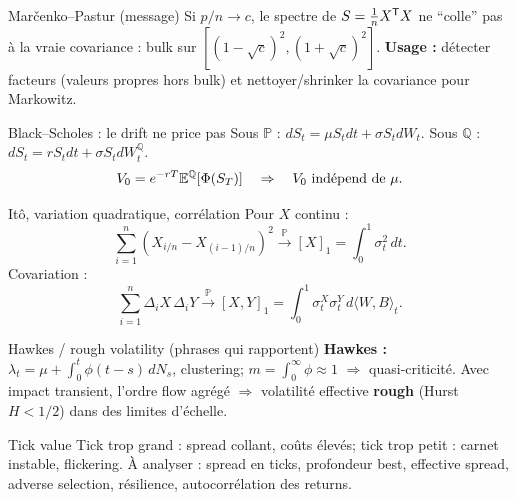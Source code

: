 \begin{recapbox}{Mar\v{c}enko--Pastur (message)}
Si $p/n\to c$, le spectre de $S=\frac1n X^{\mathsf{T}} X$ ne ``colle'' pas à la vraie covariance : bulk sur $[(1-\sqrt c)^2,(1+\sqrt c)^2]$.
\textbf{Usage :} détecter facteurs (valeurs propres hors bulk) et nettoyer/shrinker la covariance pour Markowitz.
\end{recapbox}

\begin{recapbox}{Black--Scholes : le drift ne price pas}
Sous $\mathbb{P}$ : $dS_t=\mu S_tdt+\sigma S_tdW_t$. Sous $\mathbb{Q}$ : $dS_t=rS_tdt+\sigma S_tdW_t^{\mathbb{Q}}$.
\[
V_0=e^{-rT}\mathbb{E}^{\mathbb{Q}}[\Phi(S_T)]\quad\Rightarrow\quad V_0\ \text{indépend de }\mu.
\]
\end{recapbox}

\begin{recapbox}{Itô, variation quadratique, corrélation}
Pour $X$ continu :
\[
\sum_{i=1}^n (X_{i/n}-X_{(i-1)/n})^2 \xrightarrow{\mathbb{P}} [X]_1=\int_0^1 \sigma_t^2\,dt.
\]
Covariation :
\[
\sum_{i=1}^n \Delta_i X\,\Delta_i Y \xrightarrow{\mathbb{P}} [X,Y]_1=\int_0^1 \sigma_t^X\sigma_t^Y\,d\langle W,B\rangle_t.
\]
\end{recapbox}

\begin{recapbox}{Hawkes / rough volatility (phrases qui rapportent)}
\textbf{Hawkes :} $\lambda_t=\mu+\int_0^t \phi(t-s)\,dN_s$, clustering; $m=\int_0^\infty\phi \approx 1$ $\Rightarrow$ quasi-criticité.
Avec impact transient, l'ordre flow agrégé $\Rightarrow$ volatilité effective \textbf{rough} (Hurst $H<1/2$) dans des limites d'échelle.
\end{recapbox}

\begin{recapbox}{Tick value}
Tick trop grand : spread collant, coûts élevés; tick trop petit : carnet instable, flickering.
À analyser : spread en ticks, profondeur best, effective spread, adverse selection, résilience, autocorrélation des returns.
\end{recapbox}

